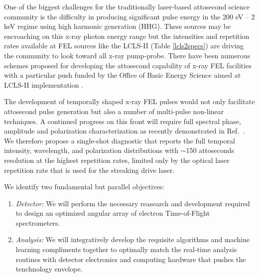 One of the biggest challenges for the traditionally laser-based attosecond science community is the difficulty in producing significant pulse energy in the 200 eV -- 2 keV regime using high harmonic generation (HHG)\cite{Chen2014,Schmidt2016}.
These sources may be encroaching on this x-ray photon energy range \cite{Biegert2014,Zenghu2017} but the intensities and repetition rates available at FEL sources like the LCLS-II (Table \ref{lcls2specs}) are driving the community to look toward all x-ray pump-probe. 
There have been numerous schemes proposed for developing the attosecond capability of x-ray FEL facilities \cite{Ding2009,Xiang2009} with a particular push funded by the Office of Basic Energy Science aimed at LCLS-II implementation \cite{Marinelli2016,xLEAP}.

The development of temporally shaped x-ray FEL pulses would not only facilitate attosecond pulse generation but also a number of multi-pulse non-linear techniques\cite{Review2017}.
A continued progress on this front \cite{Lutman13_twocolor,Marinelli13_twocolor,Allaria2014,Marinelli2015,Prince2016,Lutman2016,Marinelli2016} will require full spectral phase, amplitude and polarization characterization as recently demonstrated in Ref.~\cite{Nick2018}.
We therefore propose a single-shot diagnostic that reports the full temporal intensity, wavelength, and polarization distributions with $\sim$150 attoseconds resolution at the highest repetition rates, limited only by the optical laser repetition rate that is used for the streaking drive laser.

We identify two fundamental but parallel objectives:
\begin{enumerate}
\item \emph{Detector:} We will perform the necessary reasearch and development required to design an optimized angular array of electron Time-of-Flight spectrometers.
\item \emph{Analysis:} We will integratively develop the requisite algorithms and machine learning compliments together to optimally match the real-time analysis routines with detector electronics and computing hardware that pushes the tenchnology envelope.
\end{enumerate}

